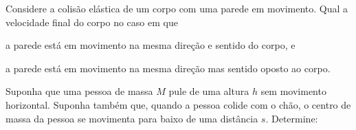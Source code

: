 \documentclass[]{IMTexam}
\begin{document}
\begin{questions}
	\begin{solution}

	\end{solution}

	\question Considere a colisão elástica de um corpo com uma parede em movimento. Qual a velocidade final do corpo no caso em que \begin{romanlistinline}[label=(\roman*)]
		\item a parede está em movimento na mesma direção e sentido do corpo, e
		\item a parede está em movimento na mesma direção mas sentido oposto ao corpo.
	\end{romanlistinline}

	\begin{solution}

	\end{solution}

	\question Suponha que uma pessoa de massa $ M $ pule de uma altura $ h $ sem movimento horizontal. Suponha também que, quando a pessoa colide com o chão, o centro de massa da pessoa se movimenta para baixo de uma distância $ s $. Determine:

\end{questions}
\end{document}
